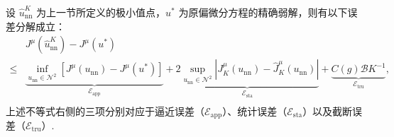 \begin{theorem}[误差分解]\label{th:energyerr}
设 $\widehat{u}^{K}_{\text{nn}}$ 为上一节所定义的极小值点，$u^{*}$ 为原偏微分方程的精确弱解，则有以下误差分解成立：
\begin{equation*}
\begin{aligned}
&J^{\mu}\left(\widehat{u}_{\text{nn}}^{K}\right)-J^{\mu}(u^{*})&\\
\leq&\displaystyle\underbrace{ \inf _{u_{\text{nn}} \in \mathcal{N}^{2}}\left[ J^{\mu}(u_{\text{nn}})- J^{\mu}(u^{*})\right]}_{\mathcal{E}_{\text{app}}}+\underbrace{2 \sup _{u_{\text{nn}} \in \mathcal{N}^{2}}\left|J^{\mu}_{K}(u_{\text{nn}})-\widehat{J}^{\mu}_{K}(u_{\text{nn}})\right|}_{\mathcal{E}_{\text{sta}}}+\underbrace{C(g)\mathcal{B}K^{-1}}_{\mathcal{E}_{\text{tru}}},&\\
\end{aligned}
\end{equation*}
上述不等式右侧的三项分别对应于逼近误差（$\mathcal{E}_{\text{app}}$）、统计误差（$\mathcal{E}_{\text{sta}}$）以及截断误差（$\mathcal{E}_{\text{tru}}$）.
\end{theorem}
